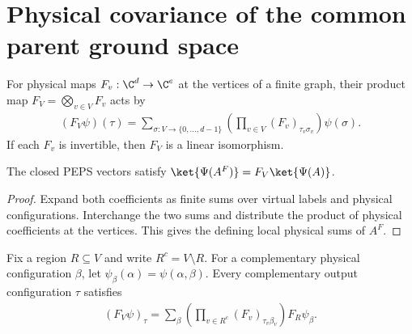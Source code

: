 \section{Physical covariance of the common parent ground space}%
\label{sec:peps_region_physical_ground_space_transport}

\begin{definition}%
    \label{def:peps_global_physical_map}
    \leanok
    For physical maps $F_v:\C^d\to\C^e$ at the vertices of a finite
    graph, their product map $F_V=\bigotimes_{v\in V}F_v$ acts by
    \begin{align}
        (F_V\psi)(\tau)=\sum_{\sigma:V\to\{0,\ldots,d-1\}}
        \left(\prod_{v\in V}(F_v)_{\tau_v\sigma_v}\right)\psi(\sigma).
    \end{align}
    If each $F_v$ is invertible, then $F_V$ is a linear isomorphism.
\end{definition}

\begin{lemma}%
    \label{thm:peps_physical_deformation_closed_state}
    \leanok
    The closed PEPS vectors satisfy
    $\ket{\Psi(A^F)}=F_V\ket{\Psi(A)}$.
\end{lemma}

\begin{proof}\leanok
    Expand both coefficients as finite sums over virtual labels and
    physical configurations. Interchange the two sums and distribute
    the product of physical coefficients at the vertices. This gives
    the defining local physical sums of $A^F$.
\end{proof}

\begin{lemma}%
    \label{thm:peps_global_physical_map_slice}
    \leanok
    Fix a region $R\subseteq V$ and write $R^c=V\setminus R$.
    For a complementary physical configuration $\beta$, let
    $\psi_\beta(\alpha)=\psi(\alpha,\beta)$.
    Every complementary output configuration $\tau$ satisfies
    \begin{align}
        (F_V\psi)_\tau
        =\sum_\beta\left(\prod_{v\in R^c}(F_v)_{\tau_v\beta_v}\right)
        F_R\psi_\beta.
    \end{align}
\end{lemma}

